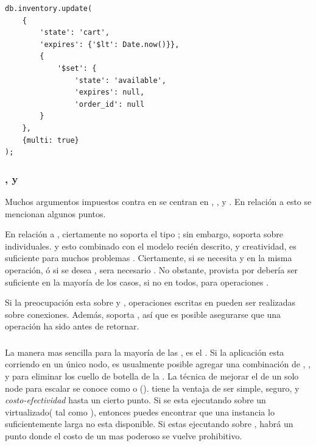 \begin{lstlisting}[caption= Ejemplo de \scriptPL corriendo \backgroundPL., label=source:javascript:example_add_script_background_mongodb]
db.inventory.update(
	{
		'state': 'cart',
		'expires': {'$lt': Date.now()}},
		{
			'$set': {
				'state': 'available',
				'expires': null,
				'order_id': null
		}
	},
	{multi: true}
);
\end{lstlisting} 

\subsubsection{\transactionsDB, \consistencyDB y \durabilityDB}

Muchos argumentos impuestos contra \nosql en \ecommerce se centran en \transactionsDB, \consistencyDB, y \durabilityDB. En relación a esto se mencionan algunos puntos.

En relación a \transactionsDB, ciertamente \mongodbNAME no soporta el tipo \multiObjectDB; sin embargo, soporta \atomicOperationsDB sobre \documentsDB individuales. y esto combinado con el modelo \documentOriented recién descrito, y creatividad, es suficiente para muchos problemas \ecommerce. Ciertamente, si se necesita \debitOneAccount y \creditAnother en la misma operación, ó si se desea \rollbackDB, sera necesario \fullFledgedTransDB. No obstante, \transactionalityDB provista por \mongodbNAME debería ser suficiente en la mayoría de los casos, si no en todos, para operaciones \ecommerce.

Si la preocupación esta sobre \consistencyDB y \durabilityDB, operaciones escritas en \mongodbNAME pueden ser realizadas \consistencyDB sobre conexiones. Además,  soporta \nearRealTimeReplicationDB, así que es posible asegurarse que una operación ha sido \replicatedDB antes de retornar.

\subsubsection{\scalabilityQA}
La manera mas sencilla para \scale la mayoría de las \dataBases, es \upgradingPC el \hardwarePC. Si la aplicación esta corriendo en un único nodo, es usualmente posible agregar una combinación de \diskPC \iopsPC, \memoryPC, y \cpuPC para eliminar los cuello de botella de la \dataBase. La técnica de mejorar el \hardwarePC de un solo node para escalar se conoce como \verticalScalingDB o \scalingUpDB(). \verticalScalingDB tiene la ventaja de ser simple, seguro, y \textit{costo-efectividad} hasta un cierto punto. Si se esta ejecutando sobre un \hardwarePC virtualizado( tal como \amazonEcdosNAME), entonces puedes encontrar que una instancia lo suficientemente larga no esta disponible. Si estas ejecutando sobre \physHardwarePC, habrá un punto donde el costo de un \serverAS mas poderoso se vuelve prohibitivo.

